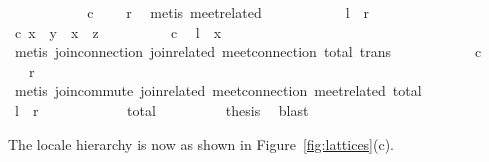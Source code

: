 \begin{isabellebody}
\ \ \ \ \ \ \ \ \isamarkupfalse%
\ \isamarkupfalse%
\ c\ \isamarkupfalse%
\ {\isachardoublequoteopen}{\isachardot}{\isachardot}{\isachardot}\ {\isacharequal}\ {\isacharquery}r{\isachardoublequoteclose}\ \isamarkupfalse%
\ {\isacharparenleft}metis\ meet{\isacharunderscore}related{}{\isacharparenright}\isanewline
\ \ \ \ \ \ \ \ \isamarkupfalse%
\ \isamarkupfalse%
\ {\isachardoublequoteopen}{\isacharquery}l\ {\isacharequal}\ {\isacharquery}r{\isachardoublequoteclose}\ \isacommand{{\isachardot}}\isamarkupfalse%
\ \isacommand{{\isacharbraceright}}\isamarkupfalse%
\isanewline
\ \ \ \ \ \ \isamarkupfalse%
\isanewline
\ \ \ \ \ \ \isacommand{{\isacharbraceleft}}\isamarkupfalse%
\ \isamarkupfalse%
\ c{\isacharcolon}\ {\isachardoublequoteopen}x\ {\isasymsqsubseteq}\ y\ {\isasymor}\ x\ {\isasymsqsubseteq}\ z{\isachardoublequoteclose}\isanewline
\ \ \ \ \ \ \ \ \isamarkupfalse%
\ c\ \isamarkupfalse%
\ {\isachardoublequoteopen}{\isacharquery}l\ {\isacharequal}\ x{\isachardoublequoteclose}\isanewline
\ \ \ \ \ \ \ \ \ \ \isamarkupfalse%
\ {\isacharparenleft}metis\ join{\isacharunderscore}connection{}\ join{\isacharunderscore}related{}\ meet{\isacharunderscore}connection\ total\ trans{\isacharparenright}\isanewline
\ \ \ \ \ \ \ \ \isamarkupfalse%
\ \isamarkupfalse%
\ c\ \isamarkupfalse%
\ {\isachardoublequoteopen}{\isachardot}{\isachardot}{\isachardot}\ {\isacharequal}\ {\isacharquery}r{\isachardoublequoteclose}\isanewline
\ \ \ \ \ \ \ \ \ \ \isamarkupfalse%
\ {\isacharparenleft}metis\ join{\isacharunderscore}commute\ join{\isacharunderscore}related{}\ meet{\isacharunderscore}connection\ meet{\isacharunderscore}related{}\ total{\isacharparenright}\isanewline
\ \ \ \ \ \ \ \ \isamarkupfalse%
\ \isamarkupfalse%
\ {\isachardoublequoteopen}{\isacharquery}l\ {\isacharequal}\ {\isacharquery}r{\isachardoublequoteclose}\ \isacommand{{\isachardot}}\isamarkupfalse%
\ \isacommand{{\isacharbraceright}}\isamarkupfalse%
\isanewline
\ \ \ \ \ \ \isamarkupfalse%
\ \isamarkupfalse%
\ total\isanewline
\ \ \ \ \ \ \isamarkupfalse%
\ \isamarkupfalse%
\ {\isacharquery}thesis\ \isamarkupfalse%
\ blast\isanewline
\ \ \ \ \isamarkupfalse%
\isanewline
\ \ \isamarkupfalse%
%
\endisatagproof
{\isafoldproof}%
%
\isadelimproof
%
\endisadelimproof
%
\begin{isamarkuptext}%
The locale hierarchy is now as shown in Figure~\ref{fig:lattices}(c).%
\end{isamarkuptext}%
\isamarkuptrue%
%
\isadelimtheory
%
\endisadelimtheory
%
\isatagtheory
{}\isamarkupfalse%
%
\endisatagtheory
{\isafoldtheory}%
%
\isadelimtheory
%
\endisadelimtheory
\isanewline
\end{isabellebody}%
